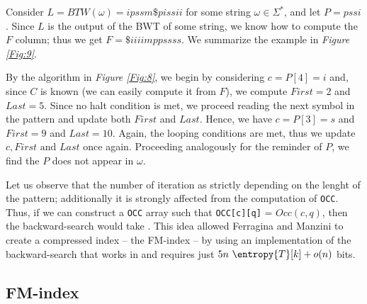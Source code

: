 \documentclass{subfiles}
\begin{document}
        \begin{example*}
            Consider \(L = BTW(\omega) = ipssm\$pissii\) for some string \(\omega \in \Sigma^{*}\),
            and let \(P = pssi\). Since \(L\) is the output of the BWT of some string,
            we know how to compute the \(F\) column\footnotemark; thus we get \(F = \$ iiiimppssss\).
            We summarize the example in \emph{Figure \ref{Fig:9}}.
            

            By the algorithm in \emph{Figure \ref{Fig:8}}, we begin by considering 
            \(c = P[4] = i\) and, since \(C\) is known (we can easily compute it from \(F\)),
            we compute \(First = 2\) and \(Last = 5\). Since no halt condition is met,
            we proceed reading the next symbol in the pattern and update both \(First\) and \(Last\).
            Hence, we have \(c = P[3] = s\) and \(First = 9\) and \(Last = 10\). 
            Again, the looping conditions are met, thus we update \(c, First \text{ and } Last\)
            once again. Proceeding analogously for the reminder of \(P\), 
            we find the \(P\) does not appear in \(\omega\).

        \end{example*}

        Let us observe that the number of iteration as strictly depending on the lenght of the pattern;
            additionally it is strongly affected from the computation of \lstinline{OCC}.
            Thus, if we can construct a \lstinline{OCC} array such that \lstinline{OCC[c][q]} = \(Occ(c, q)\),
            then the backward-search would take .
            This idea allowed Ferragina and Manzini to create a compressed index -- the FM-index -- 
            by using an implementation of the backward-search that works in  and requires just 
            \(5n \ \entropy{T}[k] + o(n)\) bits.

        \subsection{FM-index}\label{Sec:7.1}
        
        \cleardoublepage
\end{document}
